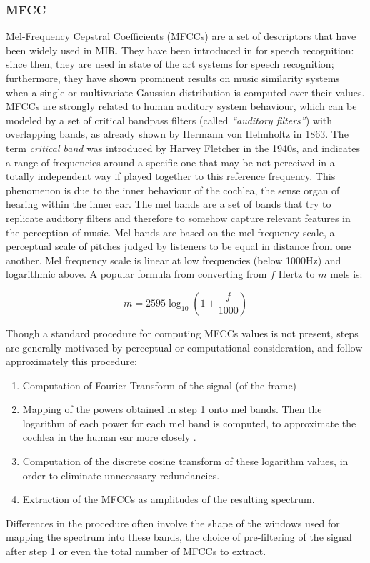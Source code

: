 \subsubsection{MFCC}
Mel-Frequency Cepstral Coefficients (MFCCs) are a set of descriptors that have been widely used in MIR. They have been introduced in \cite{davis80} for speech recognition: since then, they are used in state of the art systems for speech recognition; furthermore, they have shown prominent results on music similarity systems when a single or multivariate Gaussian distribution is computed over their values. \\MFCCs are strongly related to human auditory system behaviour, which can be modeled by a set of critical bandpass filters (called \textit{``auditory filters''}) with overlapping bands, as already shown by Hermann von Helmholtz in 1863. The term \textit{critical band} was introduced by Harvey Fletcher in the 1940s, and indicates a range of frequencies around a specific one that may be not perceived in a totally independent way if played together to this reference frequency. This phenomenon is due to the inner behaviour of the cochlea, the sense organ of hearing within the inner ear. The mel bands are a set of bands that try to replicate auditory filters and therefore to somehow capture relevant features in the perception of music. Mel bands are based on the mel frequency scale, a perceptual scale of pitches judged by listeners to be equal in distance from one another. Mel frequency scale is linear at low frequencies (below 1000Hz) and logarithmic above. A popular formula from converting from $f$ Hertz to $m$ mels is:

\begin{equation}
m = 2595\log_{10}\left(1 + \frac{f}{1000} \right)
\end{equation}

Though a standard procedure for computing MFCCs values is not present, steps are generally motivated by perceptual or computational consideration, and follow approximately this procedure:
\begin{enumerate}
\item Computation of Fourier Transform of the signal (of the frame)
\item Mapping of the powers obtained in step 1 onto mel bands. Then the logarithm of each power for each mel band is computed, to approximate the cochlea in the human ear more closely \cite{mirage07}.
\item Computation of the discrete cosine transform of these logarithm values, in order to eliminate unnecessary redundancies.
\item Extraction of the MFCCs as amplitudes of the resulting spectrum. 
\end{enumerate}
Differences in the procedure often involve the shape of the windows used for mapping the spectrum into these bands, the choice of pre-filtering of the signal after step 1 or even the total number of MFCCs to extract. 

